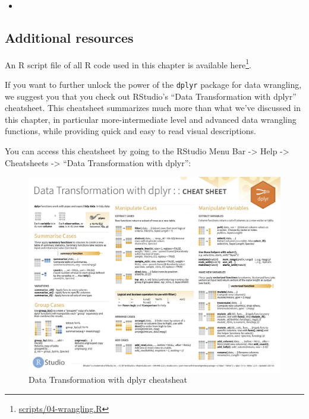 \documentclass[12pt, krantz2,]{krantz}
\renewcommand{\href}[2]{#2\footnote{\url{#1}}}
\newenvironment{rmdblock}[1]
  {\begin{shaded*}
  \begin{itemize}
  \renewcommand{\labelitemi}{
    \raisebox{-.7\height}[0pt][0pt]{
    }
  }
  \item
  }
  {
  \end{itemize}
  \end{shaded*}
  }
\newenvironment{learncheck}
  {\begin{rmdblock}{warning}}
  {\end{rmdblock}}
\begin{document}
\begin{learncheck}

\end{learncheck}

\hypertarget{additional-resources-2}{%
\subsection{Additional resources}\label{additional-resources-2}}

An R script file of all R code used in this chapter is available \href{scripts/04-wrangling.R}{here}.

If you want to further unlock the power of the \texttt{dplyr} package for data wrangling, we suggest you that you check out RStudio's ``Data Transformation with dplyr'' cheatsheet. This cheatsheet summarizes much more than what we've discussed in this chapter, in particular more-intermediate level and advanced data wrangling functions, while providing quick and easy to read visual descriptions.

You can access this cheatsheet by going to the RStudio Menu Bar -\textgreater{} Help -\textgreater{} Cheatsheets -\textgreater{} ``Data Transformation with dplyr'':

\begin{figure}

{\centering \includegraphics[width=\textwidth]{images/dplyr_cheatsheet-1} 

}

\caption{Data Transformation with dplyr cheatsheat}\label{fig:dplyr-cheatsheet}
\end{figure}
\end{document}
